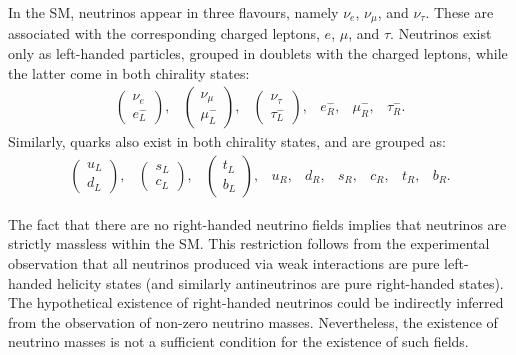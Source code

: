 In the SM, neutrinos appear in three flavours, namely $\nu_{e}$, $\nu_{\mu}$, and $\nu_{\tau}$. These are associated with the corresponding charged leptons, $e$, $\mu$, and $\tau$. Neutrinos exist only as left-handed particles, grouped in doublets with the charged leptons, while the latter come in both chirality states:
\begin{equation}
	\begin{array}{cccccc}
		\begin{pmatrix}\nu_{e}\\e^{-}_{L}\end{pmatrix},&\begin{pmatrix}\nu_{\mu}\\\mu^{-}_{L}\end{pmatrix},&\begin{pmatrix}\nu_{\tau}\\\tau^{-}_{L}\end{pmatrix},&e^{-}_{R},&\mu^{-}_{R},&\tau^{-}_{R}.
	\end{array}
\end{equation}
Similarly, quarks also exist in both chirality states, and are grouped as:
\begin{equation}
	\begin{array}{ccccccccc}
		\begin{pmatrix}u_{L}\\d_{L}\end{pmatrix},&\begin{pmatrix}s_{L}\\c_{L}\end{pmatrix},&\begin{pmatrix}t_{L}\\b_{L}\end{pmatrix},&u_{R},&d_{R},&s_{R},&c_{R},&t_{R},&b_{R}.
	\end{array}
\end{equation}

The fact that there are no right-handed neutrino fields implies that neutrinos are strictly massless within the SM. This restriction follows from the experimental observation that all neutrinos produced via weak interactions are pure left-handed helicity states \cite{Goldhaber1958} (and similarly antineutrinos are pure right-handed states). The hypothetical existence of right-handed neutrinos could be indirectly inferred from the observation of non-zero neutrino masses. Nevertheless, the existence of neutrino masses is not a sufficient condition for the existence of such fields.

